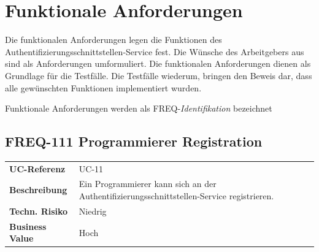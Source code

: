 \newpage

\section{Funktionale Anforderungen}\label{funktionale-anforderungen}

Die funktionalen Anforderungen legen die Funktionen des
Authentifizierungsschnittstellen-Service fest. Die Wünsche des
Arbeitgebers aus sind als Anforderungen umformuliert. Die funktionalen
Anforderungen dienen als Grundlage für die Testfälle. Die Testfälle
wiederum, bringen den Beweis dar, dass alle gewünschten Funktionen
implementiert wurden.

Funktionale Anforderungen werden als FREQ-\emph{Identifikation}
bezeichnet

\subsection{FREQ-111 Programmierer
Registration}\label{freq-111-programmierer-registration}

\begin{longtable}[c]{@{}ll@{}}
\toprule
\begin{minipage}[t]{0.20\columnwidth}\raggedright\strut
\textbf{UC-Referenz}
\strut\end{minipage} &
\begin{minipage}[t]{0.74\columnwidth}\raggedright\strut
UC-11
\strut\end{minipage}\tabularnewline
\begin{minipage}[t]{0.20\columnwidth}\raggedright\strut
\textbf{Beschreibung}
\strut\end{minipage} &
\begin{minipage}[t]{0.74\columnwidth}\raggedright\strut
Ein Programmierer kann sich an der
Authentifizierungsschnittstellen-Service registrieren.
\strut\end{minipage}\tabularnewline
\begin{minipage}[t]{0.20\columnwidth}\raggedright\strut
\textbf{Techn. Risiko}
\strut\end{minipage} &
\begin{minipage}[t]{0.74\columnwidth}\raggedright\strut
Niedrig
\strut\end{minipage}\tabularnewline
\begin{minipage}[t]{0.20\columnwidth}\raggedright\strut
\textbf{Business Value}
\strut\end{minipage} &
\begin{minipage}[t]{0.74\columnwidth}\raggedright\strut
Hoch
\strut\end{minipage}\tabularnewline
\bottomrule
\end{longtable}


